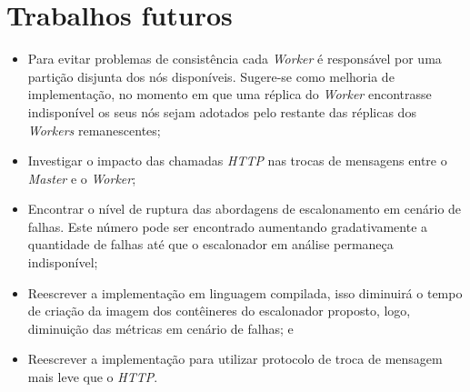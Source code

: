 \section{Trabalhos futuros}
\begin{itemize}
	\item Para evitar problemas de consistência cada \textit{Worker} é responsável por uma partição disjunta dos nós disponíveis. Sugere-se como melhoria de implementação, no momento em que uma réplica do \textit{Worker} encontrasse indisponível os seus nós sejam adotados pelo restante das réplicas dos \textit{Workers} remanescentes;
	\item Investigar o impacto das chamadas \textit{HTTP} nas trocas de mensagens entre o \textit{Master} e o \textit{Worker};
	\item Encontrar o nível de ruptura das abordagens de escalonamento em cenário de falhas. Este número pode ser encontrado aumentando gradativamente a quantidade de falhas até que o escalonador em análise permaneça indisponível;
	\item Reescrever a implementação em linguagem compilada, isso diminuirá o tempo de criação da imagem dos contêineres do escalonador proposto, logo, diminuição das métricas em cenário de falhas; e
	\item Reescrever a implementação para utilizar protocolo de troca de mensagem mais leve que o \textit{HTTP}.
\end{itemize}


